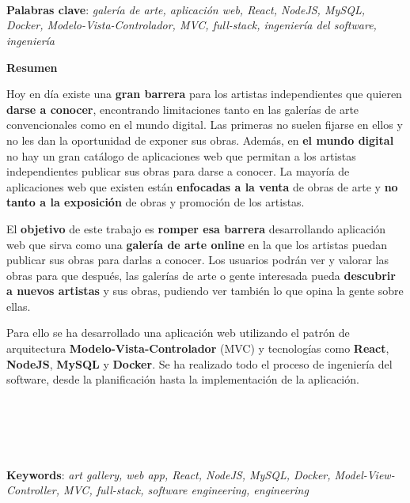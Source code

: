 \thispagestyle{empty}

\begin{center}
{\large\bfseries \titulo \\ \subtitulo }\\
\end{center}
\begin{center}
\minombre\\
\end{center}


\vspace{0.5cm}
\noindent\textbf{Palabras clave}: \textit{galería de arte, aplicación web, React,
NodeJS, MySQL, Docker, Modelo-Vista-Controlador, MVC, full-stack, ingeniería del software,
ingeniería}
\vspace{0.7cm}

\noindent\textbf{Resumen}

\bigskip
Hoy en día existe una \textbf{gran barrera} para los artistas independientes que quieren
\textbf{darse a conocer}, encontrando limitaciones tanto en las galerías de arte
convencionales como en el mundo digital. Las primeras no suelen fijarse en ellos y no les
dan la oportunidad de exponer sus obras. Además, en \textbf{el mundo digital} no hay un
gran catálogo de aplicaciones web que permitan a los artistas independientes publicar sus
obras para darse a conocer. La mayoría de aplicaciones web que existen están
\textbf{enfocadas a la venta} de obras de arte y \textbf{no tanto a la exposición} de
obras y promoción de los artistas.

El \textbf{objetivo} de este trabajo es \textbf{romper esa barrera} desarrollando
aplicación web que sirva como una \textbf{galería de arte online} en la que los artistas
puedan publicar sus obras para darlas a conocer. Los usuarios podrán ver y valorar las
obras para que después, las galerías de arte o gente interesada pueda \textbf{descubrir a
nuevos artistas} y sus obras, pudiendo ver también lo que opina la gente sobre ellas.

Para ello se ha desarrollado una aplicación web utilizando el patrón de arquitectura
\textbf{Modelo-Vista-Controlador} (MVC) y tecnologías como \textbf{React},
\textbf{NodeJS}, \textbf{MySQL} y \textbf{Docker}. Se ha realizado todo el proceso de
ingeniería del software, desde la planificación hasta la implementación de la aplicación.

\cleardoublepage

\begin{center}
	{\large\bfseries \titulo \\ \subtituloingles }\\
\end{center}
\begin{center}
	\minombre\\
\end{center}
\vspace{0.5cm}
\noindent\textbf{Keywords}: \textit{art gallery, web app, React, NodeJS, MySQL, Docker,
Model-View-Controller, MVC, full-stack, software engineering, engineering}
\vspace{0.7cm}

